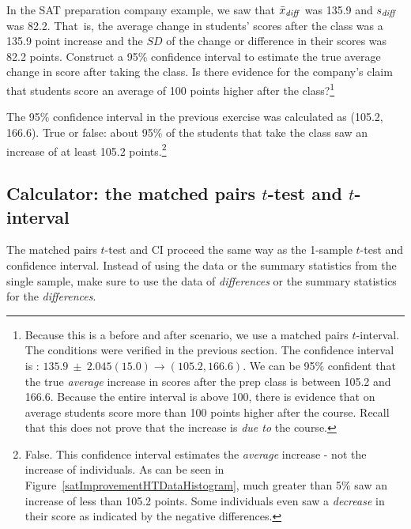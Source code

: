 \begin{exercise}In the SAT preparation company example, we saw that $\bar{x}_{\text{\emph{diff}}}$ was 135.9 and $s_{\text{\emph{diff}}}$ was 82.2. That~is, the average change in students' scores after the class was a 135.9 point increase and the $SD$ of the change or difference in their scores was 82.2 points. Construct a 95\% confidence interval to estimate the true average change in score after taking the class. Is there evidence for the company's claim that students score an average of 100 points higher after the class?\footnote{Because this is a before and after scenario, we use a matched pairs $t$-interval. The conditions were verified in the previous section. The confidence interval is : $135.9\ \pm \ 2.045(15.0) \to (105.2, 166.6)$. We can be 95\% confident that the true \emph{average} increase in scores after the prep class is between 105.2 and 166.6. Because the entire interval is above 100, there is evidence that on average students score more than 100 points higher after the course. Recall that this does not prove that the increase is \emph{due to}  the course.}
\end{exercise}

\textA{\newpage}

\begin{exercise}The 95\% confidence interval in the previous exercise was calculated as (105.2, 166.6). True or false: about 95\% of the students that take the class saw an increase of at least 105.2 points.\footnote{False. This confidence interval estimates the \emph{average} increase - not the increase of individuals. As can be seen in Figure~\ref{satImprovementHTDataHistogram}, much greater than 5\% saw an increase of less than 105.2 points. Some individuals even saw a \emph{decrease} in their score as indicated by the negative differences.}
\end{exercise}


\subsection{Calculator: the matched pairs $t$-test and $t$-interval}

The matched pairs $t$-test and CI proceed the same way as the 1-sample $t$-test and confidence interval. Instead of using the data or the summary statistics from the single sample, make sure to use the data of \emph{differences} or the summary statistics for the \emph{differences}.

